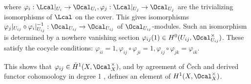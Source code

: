 where $\varphi_{i}:\Lcal|_{U_{i}}\to\Ocal_{U_{i}},\varphi_{j}:\Lcal|_{U_{j}}\to\Ocal_{U_{j}}$ are the trivializing isomorphisms of $\Lcal$ on the cover. This gives isomorphisms $\varphi_{j}|_{U_{ij}}\circ\varphi_{i}|_{U_{ij}}^{-1}:\Ocal_{U_{ij}}\to\Ocal_{U_{ij}}$ of $\Ocal_{U_{ij}}$-modules. Such an isomorphism is determined by a nowhere vanishing section $\varphi_{ij}(1)\in H^{0}(U_{ij},\Ocal_{U_{ij}}^{\times})$. These satisfy the cocycle conditions: $\varphi_{ii}=1,\varphi_{ij}\circ\varphi_{ji}=1, \varphi_{ij}\circ\varphi_{jk}=\varphi_{ik}$. 

This shows that $\varphi_{ij}\in\check{H}^{1}(X,\Ocal_{X}^{\times})$, and by agreement of \v{C}ech and derived functor cohomoology in degree 1 , defines an element of $H^{1}(X,\Ocal_{X}^{\times})$. 

